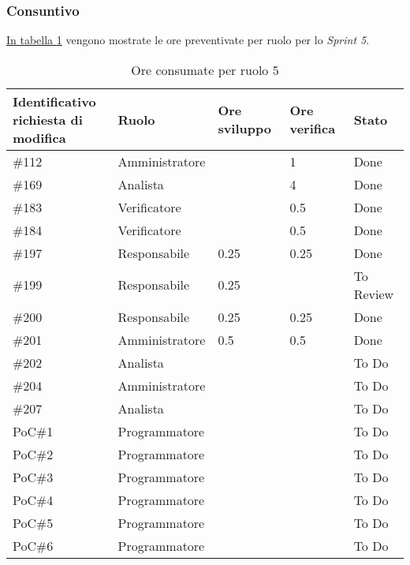 \subsubsection{Consuntivo}
\label{sec:sprint5_consuntivo}
\hyperref[tab:sprint5_ore_consumate]{In tabella \ref{tab:sprint5_ore_consumate}} vengono mostrate le ore preventivate per ruolo per lo \textit{Sprint 5}.

\begin{table}[H]
    \centering
    \begin{tabular}{| l | l | l | l | l |}
        \hline
            \makecell{\textbf{Identificativo} \\ \textbf{richiesta di modifica}} &
            \textbf{Ruolo} & 
            \textbf{Ore sviluppo} &
            \textbf{Ore verifica} & 
            \textbf{Stato}\\ 
        \hline        
        \#112 & Amministratore &  & 1 & Done\\
        \hline        
        \#169 & Analista &  & 4 & Done\\
        \hline        
        \#183 & Verificatore &  & 0.5 & Done\\
        \hline        
        \#184 & Verificatore &  & 0.5 & Done\\
        \hline        
        \#197 & Responsabile & 0.25 & 0.25 & Done\\
        \hline
        \#199 & Responsabile & 0.25 & & To Review\\
        \hline
        \#200 & Responsabile & 0.25 & 0.25 & Done\\
        \hline
        \#201 & Amministratore & 0.5 & 0.5 & Done\\
        \hline
        \#202 & Analista &  &  & To Do\\
        \hline
        \#204 & Amministratore & & & To Do\\
        \hline
        \#207 & Analista &  &  & To Do\\
        \hline
        PoC\#1 & Programmatore & & & To Do\\
        \hline
        PoC\#2 & Programmatore & & & To Do\\
        \hline
        PoC\#3 & Programmatore & & & To Do\\
        \hline
        PoC\#4 & Programmatore & & & To Do\\
        \hline
        PoC\#5 & Programmatore & & & To Do\\
        \hline
        PoC\#6 & Programmatore & & & To Do\\
        \hline
    \end{tabular}
    \caption{Ore consumate per ruolo  5}
    \label{tab:sprint5_ore_consumate} 
\end{table}